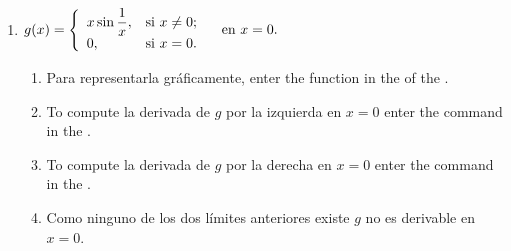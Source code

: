 \begin{enumerate}[leftmargin=*]
\begin{enumerate}
      \item $g(x)=\left\{
            \begin{array}{ll}
            x \sin\dfrac{1}{x}, & \hbox{si $x\neq 0$;} \\
            0,                  & \hbox{si $x=0$.}     \\
            \end{array}
            \right. \quad \textrm{en $x=0$.}$

            \begin{indication}
            \begin{enumerate}
            \item Para representarla gráficamente, enter the function  in the  of the .
            \item To compute la derivada de $g$ por la izquierda en $x=0$ enter the command  in the .
            \item To compute la derivada de $g$ por la derecha en $x=0$ enter the command  in the .
            \item Como ninguno de los dos límites anteriores existe $g$ no es derivable en $x=0$.
            \end{enumerate}
            \end{indication}
      \end{enumerate}



\end{enumerate}

